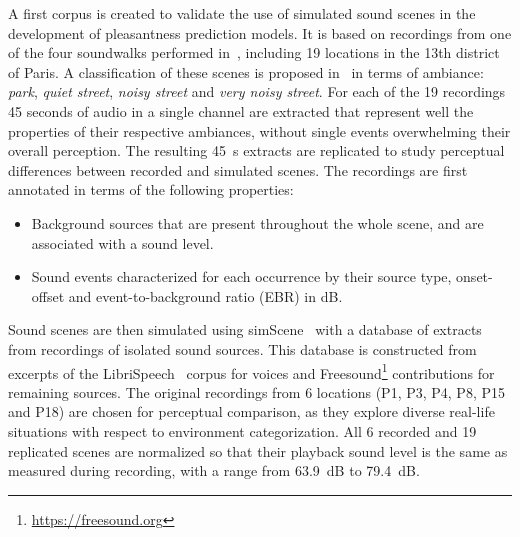 \documentclass[11pt,a4paper]{article}
\begin{document}
A first corpus is created to validate the use of simulated sound scenes in the development of pleasantness prediction models. It is based on recordings from one of the four soundwalks performed in~\cite{aumond2017}, including 19 locations in the 13th district of Paris. A classification of these scenes is proposed in~\cite{gloaguen2017} in terms of ambiance: \textit{park}, \textit{quiet street}, \textit{noisy street} and \textit{very noisy street}. For each of the 19 recordings 45 seconds of audio in a single channel are extracted that represent well the properties of their respective ambiances, without single events overwhelming their overall perception. The resulting 45~s extracts are replicated to study perceptual differences between recorded and simulated scenes. The recordings are first annotated in terms of the following properties:

\begin{itemize}
\item Background sources that are present throughout the whole scene, and are associated with a sound level.
\item Sound events characterized for each occurrence by their source type, onset-offset and event-to-background ratio (EBR) in dB.
\end{itemize}

Sound scenes are then simulated using simScene~\cite{rossignol2015} with a database of extracts from recordings of isolated sound sources. This database is constructed from excerpts of the LibriSpeech~\cite{panayotov2015} corpus for voices and Freesound\footnote{\url{https://freesound.org}} contributions for remaining sources. The original recordings from 6 locations (P1, P3, P4, P8, P15 and P18) are chosen for perceptual comparison, as they explore diverse real-life situations with respect to environment categorization. All 6 recorded and 19 replicated scenes are normalized so that their playback sound level is the same as measured during recording, with a range from 63.9~dB to 79.4~dB.\\
\end{document}

